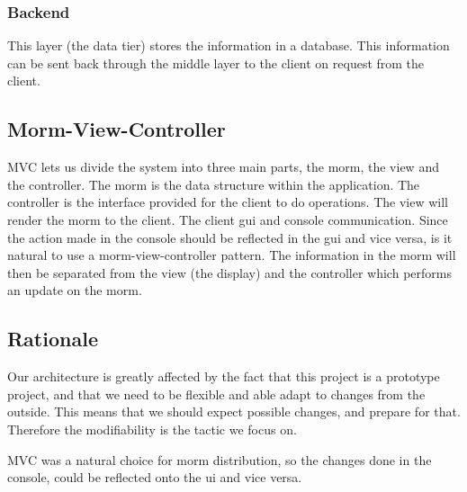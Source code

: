 \subsubsection{Backend}
This layer (the data tier) stores the information in a database. This information can be sent back through the middle layer to the client on request from the client.


\subsection{Morm-View-Controller}
MVC lets us divide the system into three main parts, the morm, the view and the controller. The morm is the data structure within the application. The controller is the interface provided for the client to do operations. The view will render the morm to the client.
The client gui and console communication. Since the action made in the console should be reflected in the gui and vice versa, is it natural to use a morm-view-controller pattern. The information in the morm will then be separated from the view (the display) and the controller which performs an update on the morm.


\subsection{Rationale} \label{Rationale}
Our architecture is greatly affected by the fact that this project is a prototype project, and that we need to be flexible and able adapt to changes from the outside. This means that we should expect possible changes, and prepare for that. Therefore the modifiability is the tactic we focus on.

MVC was a natural choice for morm distribution, so the changes done in the console, could be reflected onto the ui and vice versa.

